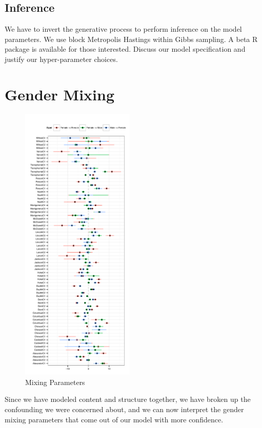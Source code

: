 \documentclass{pnastwo}
\begin{document}
\begin{article}
\subsection{Inference}
 We have to invert the generative process to perform inference on the model parameters.
We use block Metropolis Hastings within Gibbs sampling.
A beta R package is available for those interested.
Discuss our model specification and justify our hyper-parameter choices.


\section{Gender Mixing}


 \begin{figure}
\caption{\label{fig:Mixing parameters} Mixing Parameters}	
\centering
\includegraphics[width = 0.48\textwidth]{images/Mixing_Parameter_Plot.pdf}
\end{figure}

Since we have modeled content and structure together, we have broken up the confounding we were concerned about, and we can now interpret the gender mixing parameters that come out of our model with more confidence.
	

\end{article}
\end{document}

